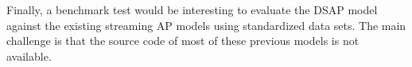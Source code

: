 Finally, a benchmark test would be interesting to evaluate the DSAP model against the existing streaming AP models using standardized data sets. The main challenge is that the source code of most of these previous models is not available. 










